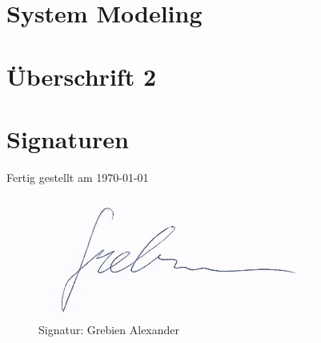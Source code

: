 \newcommand{\german}{false} %
\newcommand{\coloredTitlePage}{true} %
\newcommand{\company}{false}
\newcommand{\ECE}{true}

\usepackage{hyperref}

\makeglossaries

\makeatletter
\newcommand{\myscope}[2] %
{\draw[thick,rotate=#2] (#1) circle (12pt)
 (#1) ++(-0.35,-0.1) -- ++(0.3,0.3) --++(0,-0.3)-- ++(0.3,0.3) --++(0,-0.3);
}
\newcommand{\costumPicWidth}[0]{
0.8\textwidth
}

\newcommand{\costumPlotWidth}[0]{
\textwidth
}






\frontmatter
\renewcommand{\thepage}{\Roman{page}}



\tableofcontents
\printglossary
\mainmatter
\chapter{System Modeling}

\chapter{Überschrift 2}


\newpage
\chapter{Signaturen}
    Fertig gestellt am \today \\
    \begin{figure}[H]
        \centering
        \includegraphics{pics/signature_grebien.png}
    	\caption{Signatur: Grebien Alexander}
    	\label{pic:signatur_grebien}
    \end{figure}
        
\listoffigures
\listoftables



